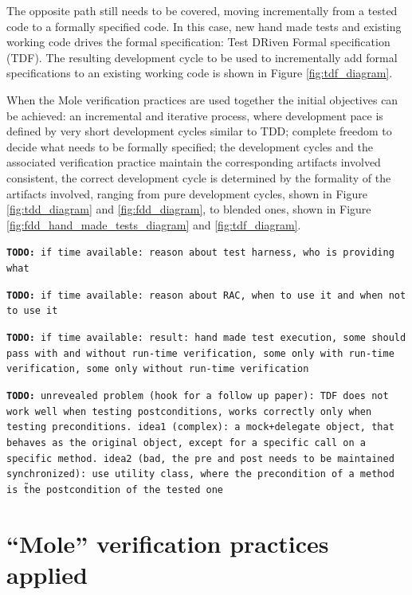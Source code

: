 \documentclass{article}
\newcommand{\todo}[1]{\texttt{\textbf{TODO:} #1}}
\begin{document}
The opposite path still needs to be covered, moving incrementally from a tested code to a formally specified code.
In this case, new hand made tests and existing working code drives the formal specification: Test DRiven Formal specification (TDF).
The resulting development cycle to be used to incrementally add formal specifications to an existing working code is shown in Figure \ref{fig:tdf_diagram}.

When the Mole verification practices are used together the initial objectives can be achieved: an incremental and iterative process, where development pace is defined by very short development cycles similar to TDD; complete freedom to decide what needs to be formally specified; the development cycles and the associated verification practice maintain the corresponding artifacts involved consistent, the correct development cycle is determined by the formality of the artifacts involved, ranging from pure development cycles, shown in Figure \ref{fig:tdd_diagram} and \ref{fig:fdd_diagram}, to blended ones, shown in Figure \ref{fig:fdd_hand_made_tests_diagram} and \ref{fig:tdf_diagram}.

\todo{if time available: reason about test harness, who is providing what}

\todo{if time available: reason about RAC, when to use it and when not to use it}

\todo{if time available: result: hand made test execution, some should pass with and without run-time verification, some only with run-time verification, some only without run-time verification}

\todo{unrevealed problem (hook for a follow up paper): TDF does not work well when testing postconditions, works correctly only when testing preconditions. idea1 (complex): a mock+delegate object, that behaves as the original object, except for a specific call on a specific method. idea2 (bad, the pre and post needs to be maintained synchronized): use utility class, where the precondition of a method is \~ the postcondition of the tested one}



\section{``Mole'' verification practices applied}
\label{sec:a_complex_case_study}
\end{document}
